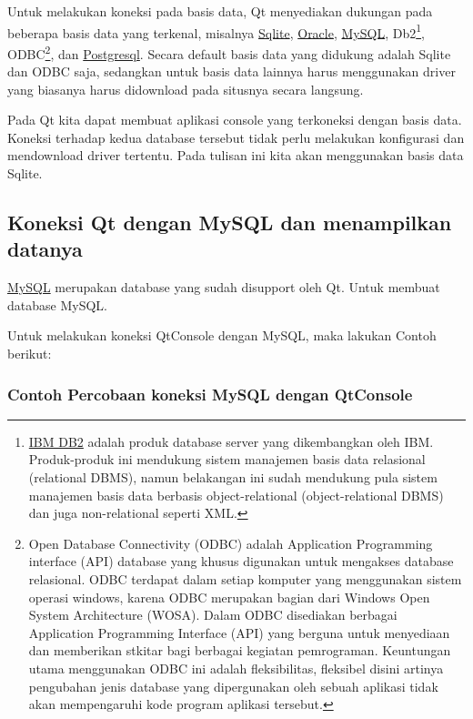 Untuk melakukan koneksi pada basis data, Qt menyediakan dukungan pada
beberapa basis data yang terkenal, misalnya
\href{https://www.sqlite.org/about.html}{Sqlite},
\href{https://en.wikipedia.org/wiki/Oracle_Database}{Oracle},
\href{https://www.mysql.com/about/}{MySQL}, Db2\footnote{\href{https://en.wikipedia.org/wiki/IBM_DB2}{IBM
  DB2} adalah produk database server yang dikembangkan oleh IBM.
  Produk-produk ini mendukung sistem manajemen basis data relasional
  (relational DBMS), namun belakangan ini sudah mendukung pula sistem
  manajemen basis data berbasis object-relational (object-relational
  DBMS) dan juga non-relational seperti XML.}, ODBC\footnote{Open
  Database Connectivity (ODBC) adalah Application Programming interface
  (API) database yang khusus digunakan untuk mengakses database
  relasional. ODBC terdapat dalam setiap komputer yang menggunakan
  sistem operasi windows, karena ODBC merupakan bagian dari Windows Open
  System Architecture (WOSA). Dalam ODBC disediakan berbagai Application
  Programming Interface (API) yang berguna untuk menyediaan dan
  memberikan stkitar bagi berbagai kegiatan pemrograman. Keuntungan
  utama menggunakan ODBC ini adalah fleksibilitas, fleksibel disini
  artinya pengubahan jenis database yang dipergunakan oleh sebuah
  aplikasi tidak akan mempengaruhi kode program aplikasi tersebut.}, dan
\href{https://id.wikipedia.org/wiki/PostgreSQL}{Postgresql}. Secara
default basis data yang didukung adalah Sqlite dan ODBC saja, sedangkan
untuk basis data lainnya harus menggunakan driver yang biasanya harus
didownload pada situsnya secara langsung.

Pada Qt kita dapat membuat aplikasi console yang terkoneksi dengan basis
data. Koneksi terhadap kedua database tersebut tidak perlu melakukan
konfigurasi dan mendownload driver tertentu. Pada tulisan ini kita akan
menggunakan basis data Sqlite.

\subsection{Koneksi Qt dengan MySQL dan menampilkan
datanya}\label{koneksi-qt-dengan-mysql-dan-menampilkan-datanya}

\href{https://www.mysql.com/}{MySQL} merupakan database yang sudah
disupport oleh Qt. Untuk membuat database MySQL.

Untuk melakukan koneksi QtConsole dengan MySQL, maka lakukan Contoh
berikut:

\subsubsection*{Contoh Percobaan koneksi MySQL dengan QtConsole}

